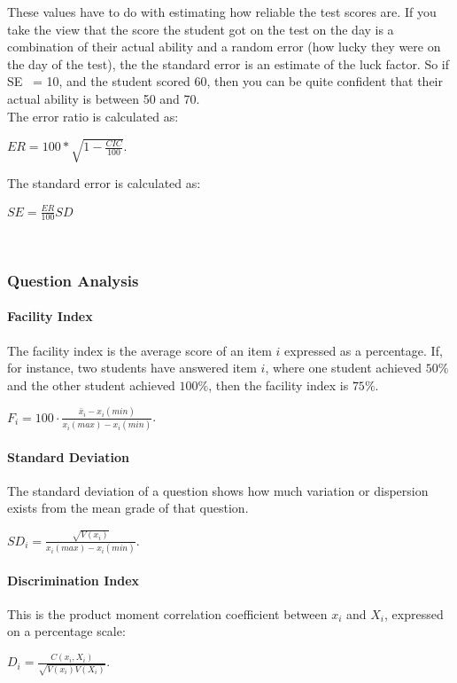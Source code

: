 \documentclass[12pt]{report}
\begin{document}
These values have to do with estimating how reliable the test scores are.
If you take the view that the score the student got on the test on the day is a combination
 of their actual ability and a random error
  (how lucky they were on the day of the test),
   the the standard error is an estimate of the luck factor. So if SE ~= 10, and the student scored 60, then you can be quite confident
    that their actual ability is between 50 and 70.\\

The error ratio is calculated as:

$ER=100*\sqrt{1-\frac{CIC}{100}}$.

The standard error is calculated as:

$SE=\frac{ER}{100}SD$

\ \\

\subsubsection{Question Analysis}
\label{subsubsec:questions}

\paragraph{Facility Index}
The facility index is the average score of an item $i$ expressed as a percentage. If, for instance, two students have answered item $i$, where one student achieved $50\%$ and the other student achieved $100\%$, then the facility index is $75\%$.

$F_i = 100\cdot\frac{\bar{x}_i - x_i(min)}{x_i(max) - x_i(min)}$. 

\paragraph{Standard Deviation}
The standard deviation of a question shows how much variation or dispersion exists from the mean grade of that question. 

$SD_i = \frac{\sqrt{V(x_i)}}{x_i(max) - x_i(min)}$.

\paragraph{Discrimination Index}
This is the product moment correlation coefficient between $x_i$ and $X_i$, expressed on a percentage scale:

$D_i= \frac{C(x_i, X_i)}{\sqrt{V(x_i)V(X_i)}}$.
\end{document}
